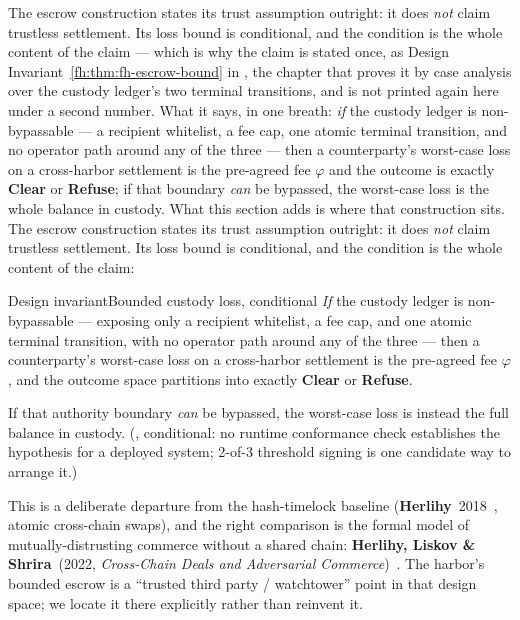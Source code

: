 \documentclass[11pt,a4paper]{article}
\theoremstyle{definition}
\theoremstyle{definition}
\theoremstyle{remark}
\begin{document}
\ifpdbook
The escrow construction states its trust assumption outright: it does \emph{not}
claim trustless settlement. Its loss bound is conditional, and the condition is the
whole content of the claim --- which is why the claim is stated once, as Design
Invariant~\ref{fh:thm:fh-escrow-bound} in , the
chapter that proves it by case analysis over the custody ledger's two terminal
transitions, and is not printed again here under a second number. What it says, in
one breath: \emph{if} the custody ledger is non-bypassable --- a recipient
whitelist, a fee cap, one atomic terminal transition, and no operator path around
any of the three --- then a counterparty's worst-case loss on a cross-harbor
settlement is the pre-agreed fee $\varphi$ and the outcome is exactly
\textbf{Clear} or \textbf{Refuse}; if that boundary \emph{can} be bypassed, the
worst-case loss is the whole balance in custody. What this section adds is where
that construction sits.
\else
The escrow construction states its trust assumption outright: it does \emph{not}
claim trustless settlement. Its loss bound is conditional, and the condition is the whole
content of the claim:

\begin{pdclaim}{Design invariant}{Bounded custody loss, conditional}
\setlength{\parskip}{4pt plus 1pt}
\label{thm:fh-escrow-bound}
\emph{If} the custody ledger is non-bypassable --- exposing only a recipient
whitelist, a fee cap, and one atomic terminal transition, with no operator path
around any of the three --- then a counterparty's worst-case loss on a cross-harbor
settlement is the pre-agreed fee $\varphi$, and the outcome space partitions into
exactly \textbf{Clear} or \textbf{Refuse}. 

If that authority boundary \emph{can} be
bypassed, the worst-case loss is instead the full balance in custody.
(\Designed{}, conditional: no runtime conformance check establishes the hypothesis
for a deployed system; 2-of-3 threshold signing is one candidate way to arrange it.)
\end{pdclaim}
\fi

\noindent This is a deliberate departure from the
hash-timelock baseline (\textbf{Herlihy}~2018~, atomic cross-chain
swaps), and the right comparison is the formal model of mutually-distrusting
commerce without a shared chain: \textbf{Herlihy, Liskov \& Shrira}~(2022, \emph{
Cross-Chain Deals and Adversarial Commerce})~. The harbor's bounded
escrow is a ``trusted third party / watchtower'' point in that design space; we
locate it there explicitly rather than reinvent it.
\end{document}
